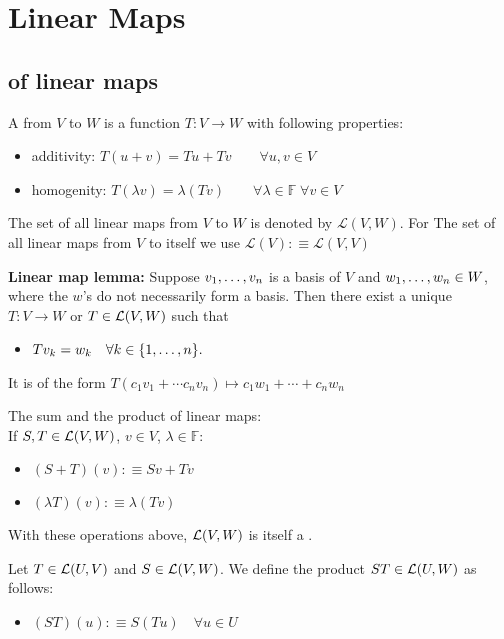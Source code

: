 \chapter{Linear Maps}
\section{\vs of linear maps}
A \lm from $V$ to $W$ is a function $T:V\to W$ with following properties:
\begin{itemize}
	\item additivity: $T(u+v)=Tu + Tv \qquad \forall u,v \in V$
	\item homogenity: $T(\lambda v)=\lambda (Tv) \qquad 
	\forall \lambda \in \mathbb{F} \; \forall v\in V$
\end{itemize}
The set of all linear maps from $V$ to $W$ is denoted by $\mathcal{L}(V,W)$. For The set of all linear maps from $V$ to itself we use $\mathcal{L}(V) :\equiv \mathcal{L}(V,V)$

\textbf{Linear map lemma: }
Suppose $v_1, \dots, v_n$ is a basis of $V$ and $w_1, \dots, w_n \in W$, where the $w$'s do not necessarily form a basis. Then there exist a unique \lm $T:V\to W$ or $T \in \mathcal{L}(V,W)$ such that
\begin{itemize}
	\item[] $Tv_{k} = w_k \quad \forall k \in \{1, \dots, n \}.$
\end{itemize}
It is of the form $T(c_1 v_1 + \cdots c_n v_n) \mapsto c_1 w_1 + \cdots + c_n w_n$

\setcounter{thm}{4}
\begin{mydef}
    The sum and the product of linear maps:\\
    If $S, T \in {\mathcal{L}(V,W)}$, $v \in V$, $\lambda \in \mathbb{F} $:
    \begin{itemize}
    	\item $(S+T)(v) :\equiv Sv+Tv$
    	\item $(\lambda T)(v) : \equiv \lambda (Tv)$
    \end{itemize}
\end{mydef}

\setcounter{thm}{5}
\begin{thm}
    With these operations above, ${\mathcal{L}(V,W)}$ is itself a \vs.
\end{thm}

\setcounter{thm}{6}
\begin{mydef}
    Let $T \in {\mathcal{L}(U, V)}$ and $S \in {\mathcal{L}(V, W)}$. We define the product $ST \in {\mathcal{L}(U, W)}$ as follows:
    \begin{itemize}
    	\item[] $(ST)(u) :\equiv S(Tu) \quad \forall u \in U$
    \end{itemize}
\end{mydef}

